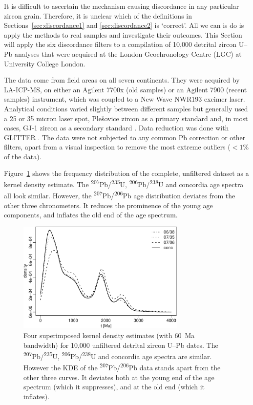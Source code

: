 \documentclass[gchron, manuscript]{copernicus}
\begin{document}
It is difficult to ascertain the mechanism causing discordance in any
particular zircon grain. Therefore, it is unclear which of the
definitions in Sections~\ref{sec:discordance1} and
\ref{sec:discordance2} is `correct'. All we can is do is apply the
methods to real samples and investigate their outcomes. This Section
will apply the six discordance filters to a compilation of 10,000
detrital zircon U--Pb analyses that were acquired at the London
Geochronology Centre (LGC) at University College London.

The data come from field areas on all seven continents. They were
acquired by LA-ICP-MS, on either an Agilent 7700x (old samples) or an
Agilent 7900 (recent samples) instrument, which was coupled to a New
Wave NWR193 excimer laser. Analytical conditions varied slightly
between different samples but generally used a 25 or 35 micron laser
spot, Ple\v{s}ovice zircon as a primary standard \citep{slama2008}
and, in most cases, GJ-1 zircon as a secondary standard
\citep{jackson2004}. Data reduction was done with GLITTER
\citep{griffin2008}. The data were not subjected to any common Pb
correction or other filters, apart from a visual inspection to remove
the most extreme outliers ($<1\%$ of the data).

Figure~\ref{fig:KDE} shows the frequency distribution of the complete,
unfiltered dataset as a kernel density estimate. The
\textsuperscript{207}Pb/\textsuperscript{235}U,
\textsuperscript{206}Pb/\textsuperscript{238}U and concordia age
spectra all look similar. However, the
\textsuperscript{207}Pb/\textsuperscript{206}Pb age distribution
deviates from the other three chronometers. It reduces the prominence
of the young age components, and inflates the old end of the age
spectrum.

\begin{figure}
  \includegraphics[width=8.3cm]{KDE.pdf}
  \caption{Four superimposed kernel density estimates (with 60~Ma
    bandwidth) for 10,000 unfiltered detrital zircon U--Pb
    dates. The \textsuperscript{207}Pb/\textsuperscript{235}U,
    \textsuperscript{206}Pb/\textsuperscript{238}U and concordia age
    spectra are similar.  However the KDE of the
    \textsuperscript{207}Pb/\textsuperscript{206}Pb data stands
    apart from the other three curves. It deviates both at the young
    end of the age spectrum (which it suppresses), and at the old
    end (which it inflates).
  }
  \label{fig:KDE}
\end{figure}
\end{document}
